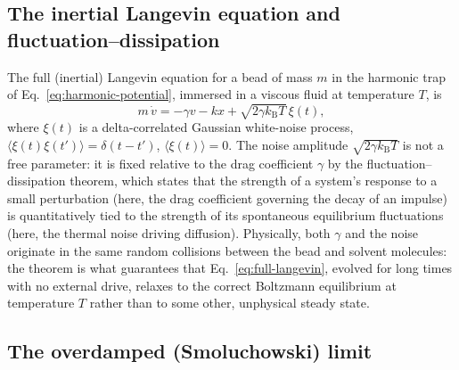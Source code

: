 \documentclass[11pt]{article}
\newcommand{\avg}[1]{\langle #1 \rangle}
\newcommand{\kB}{k_{\mathrm{B}}}
\begin{document}
\subsection{The inertial Langevin equation and fluctuation--dissipation}

The full (inertial) Langevin equation for a bead of mass $m$ in the harmonic trap of Eq.~\eqref{eq:harmonic-potential}, immersed in a viscous fluid at temperature $T$, is
\begin{equation}
m\,\dot v = -\gamma v - kx + \sqrt{2\gamma \kB T}\,\xi(t),
\label{eq:full-langevin}
\end{equation}
where $\xi(t)$ is a delta-correlated Gaussian white-noise process, $\avg{\xi(t)\xi(t')} = \delta(t-t')$, $\avg{\xi(t)}=0$. The noise amplitude $\sqrt{2\gamma \kB T}$ is not a free parameter: it is fixed relative to the drag coefficient $\gamma$ by the fluctuation--dissipation theorem, which states that the strength of a system's response to a small perturbation (here, the drag coefficient governing the decay of an impulse) is quantitatively tied to the strength of its spontaneous equilibrium fluctuations (here, the thermal noise driving diffusion). Physically, both $\gamma$ and the noise originate in the same random collisions between the bead and solvent molecules: the theorem is what guarantees that Eq.~\eqref{eq:full-langevin}, evolved for long times with no external drive, relaxes to the correct Boltzmann equilibrium at temperature $T$ rather than to some other, unphysical steady state.

\subsection{The overdamped (Smoluchowski) limit}
\end{document}
